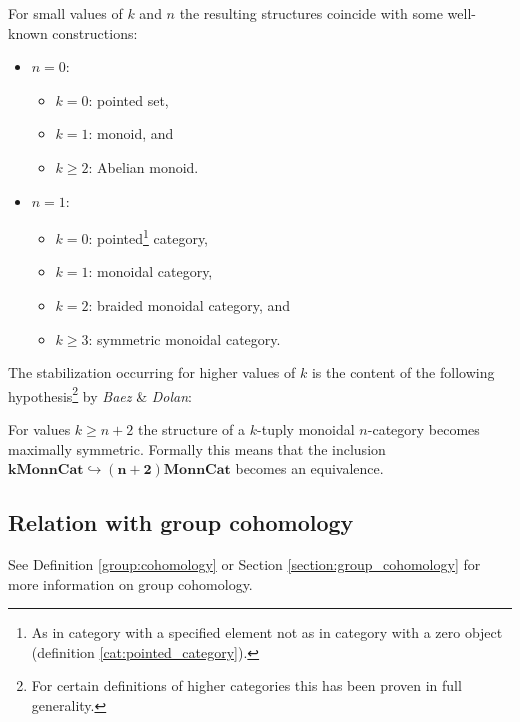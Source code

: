    \begin{example}
        For small values of $k$ and $n$ the resulting structures coincide with some well-known constructions:
        \begin{itemize}
            \item $n=0$:
                \begin{itemize}
                    \item $k=0$: pointed set,
                    \item $k=1$: monoid, and
                    \item $k\geq2$: Abelian monoid.
                \end{itemize}
            \item $n=1$:
                \begin{itemize}
                    \item $k=0$: pointed\footnote{As in category with a specified element not as in category with a zero object (definition \ref{cat:pointed_category}).} category,
                    \item $k=1$: monoidal category,
                    \item $k=2$: braided monoidal category, and
                    \item $k\geq3$: symmetric monoidal category.
                \end{itemize}
        \end{itemize}
    \end{example}
    The stabilization occurring for higher values of $k$ is the content of the following hypothesis\footnote{For certain definitions of higher categories this has been proven in full generality.} by \textit{Baez} \& \textit{Dolan}:
    \begin{theorem}
        For values $k\geq n+2$ the structure of a $k$-tuply monoidal $n$-category becomes maximally symmetric. Formally this means that the inclusion \emph{$\boldsymbol{k}\mathbf{Mon}\boldsymbol{n}\mathbf{Cat}\hookrightarrow\boldsymbol{(n+2)}\mathbf{Mon}\boldsymbol{n}\mathbf{Cat}$} becomes an equivalence.
    \end{theorem}

\subsection{Relation with group cohomology}\label{section:hda_group_cohomology}

    See Definition \ref{group:cohomology} or Section \ref{section:group_cohomology} for more information on group cohomology.

